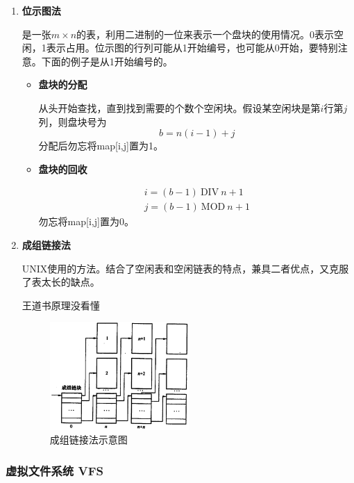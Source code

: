 \documentclass[12pt, a4paper, oneside]{ctexart}
\begin{document}
\begin{enumerate}
  \item {\bf 位示图法}
  
  是一张$m\times n$的表，利用二进制的一位来表示一个盘块的使用情况。0表示空闲，1表示占用。位示图的行列可能从1开始编号，也可能从0开始，要特别注意。下面的例子是从1开始编号的。

  \begin{itemize}
    \item {\bf 盘块的分配}
    
    从头开始查找，直到找到需要的个数个空闲块。假设某空闲块是第$i$行第$j$列，则盘块号为
    \begin{equation*}
      b=n(i-1)+j
    \end{equation*}
    分配后勿忘将map[i,j]置为1。

    \item {\bf 盘块的回收}
    
    \begin{eqnarray*}
      i=(b-1)\ \text{DIV}\ n + 1 \\
      j=(b-1)\ \text{MOD}\ n + 1
    \end{eqnarray*}
    勿忘将map[i,j]置为0。
  \end{itemize}

  \item {\bf 成组链接法}
  
  UNIX使用的方法。结合了空闲表和空闲链表的特点，兼具二者优点，又克服了表太长的缺点。

  王道书原理没看懂

  \begin{figure}[h]
    \centering
    \includegraphics[width=0.5\textwidth]{./images/group-link-example.png}
    \caption{成组链接法示意图}
  \end{figure}

\end{enumerate}

\subsubsection{虚拟文件系统 VFS}
\end{document}
